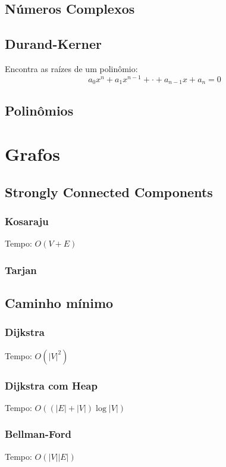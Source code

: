 \documentclass[12pt,a4paper]{article}
\begin{document}
		\subsection{Números Complexos}
			
		\subsection{Durand-Kerner}
			Encontra as raízes de um polinômio:
			\[ a_0 x^n + a_1 x^{n-1} + \cdot + a_{n-1} x + a_n = 0 \]
			
		\subsection{Polinômios}
			

	\section{Grafos}
		\subsection{Strongly Connected Components}
			\subsubsection{Kosaraju}
				Tempo: \( O(V + E) \)
				
			\subsubsection{Tarjan}
				
		\subsection{Caminho mínimo}
			\subsubsection{Dijkstra}
				Tempo: \( O(|V|^2) \)
				
			\subsubsection{Dijkstra com Heap}
				Tempo: \( O((|E| + |V|) \log |V|) \)
				
			\subsubsection{Bellman-Ford}
				Tempo: \( O(|V| |E|) \)
				
\end{document}
